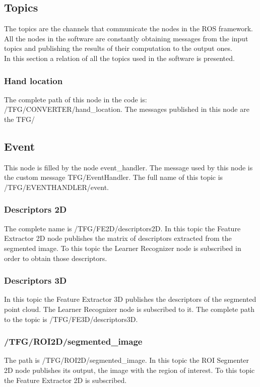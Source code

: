 \subsection{Topics}
\label{topics}

The topics are the channels that communicate the nodes in the ROS framework. All the nodes in the software are constantly obtaining messages from the input topics and publishing the results of their computation to the output ones. 
\\

In this section a relation of all the topics used in the software is presented. 


\subsubsection{Hand location}
The complete path of this node in the code is: /TFG/CONVERTER/hand\_location. The messages published in this node are the TFG/
\subsection{Event}
This node is filled by the node event\_handler. The message used by this node is the custom message TFG/EventHandler. The full name of this topic is /TFG/EVENTHANDLER/event. 

\subsubsection{Descriptors 2D}
The complete name is /TFG/FE2D/descriptors2D. In this topic the Feature Extractor 2D node publishes the matrix of descriptors extracted from the segmented image. To this topic the Learner Recognizer node is subscribed in order to obtain those descriptors.  

\subsubsection{Descriptors 3D}
In this topic the Feature Extractor 3D publishes the descriptors of the segmented point cloud. The Learner Recognizer node is subscribed to it. 
The complete path to the topic is /TFG/FE3D/descriptors3D.


\subsubsection{/TFG/ROI2D/segmented\_image}
The path  is /TFG/ROI2D/segmented\_image. In this topic the  ROI Segmenter 2D node publishes its output, the image with the region of interest. To this topic the Feature Extractor 2D is subscribed. 


